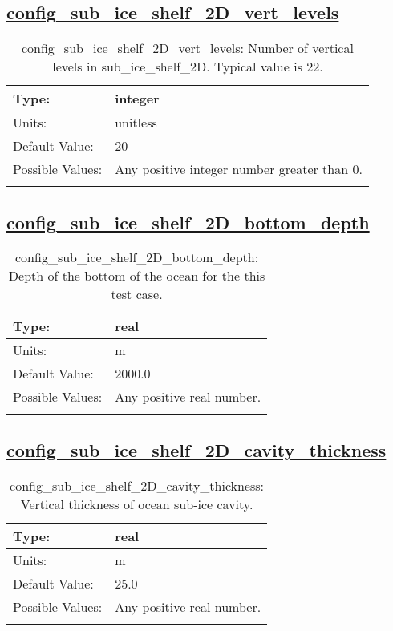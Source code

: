 \subsection[config\_sub\_ice\_shelf\_2D\_vert\_levels]{\hyperref[sec:nm_tab_sub_ice_shelf_2D]{config\_sub\_ice\_shelf\_2D\_vert\_levels}}
\label{subsec:nm_sec_config_sub_ice_shelf_2D_vert_levels}
\begin{center}
\begin{longtable}{| p{2.0in} || p{4.0in} |}
    \hline
    Type: & integer \\
    \hline
    Units: & \si{unitless} \\
    \hline
    Default Value: & 20 \\
    \hline
    Possible Values: & Any positive integer number greater than 0. \\
    \hline
    \caption{config\_sub\_ice\_shelf\_2D\_vert\_levels: Number of vertical levels in sub\_ice\_shelf\_2D. Typical value is 22.}
\end{longtable}
\end{center}
\subsection[config\_sub\_ice\_shelf\_2D\_bottom\_depth]{\hyperref[sec:nm_tab_sub_ice_shelf_2D]{config\_sub\_ice\_shelf\_2D\_bottom\_depth}}
\label{subsec:nm_sec_config_sub_ice_shelf_2D_bottom_depth}
\begin{center}
\begin{longtable}{| p{2.0in} || p{4.0in} |}
    \hline
    Type: & real \\
    \hline
    Units: & \si{m} \\
    \hline
    Default Value: & 2000.0 \\
    \hline
    Possible Values: & Any positive real number. \\
    \hline
    \caption{config\_sub\_ice\_shelf\_2D\_bottom\_depth: Depth of the bottom of the ocean for the this test case.}
\end{longtable}
\end{center}
\subsection[config\_sub\_ice\_shelf\_2D\_cavity\_thickness]{\hyperref[sec:nm_tab_sub_ice_shelf_2D]{config\_sub\_ice\_shelf\_2D\_cavity\_thickness}}
\label{subsec:nm_sec_config_sub_ice_shelf_2D_cavity_thickness}
\begin{center}
\begin{longtable}{| p{2.0in} || p{4.0in} |}
    \hline
    Type: & real \\
    \hline
    Units: & \si{m} \\
    \hline
    Default Value: & 25.0 \\
    \hline
    Possible Values: & Any positive real number. \\
    \hline
    \caption{config\_sub\_ice\_shelf\_2D\_cavity\_thickness: Vertical thickness of ocean sub-ice cavity.}
\end{longtable}
\end{center}
